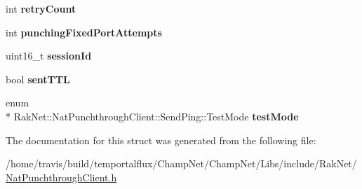 \begin{DoxyCompactItemize}
\item 
\hypertarget{struct_rak_net_1_1_nat_punchthrough_client_1_1_send_ping_a096832da2c67b8e4c1420b4d9b018a77}{int {\bfseries retry\-Count}}\label{struct_rak_net_1_1_nat_punchthrough_client_1_1_send_ping_a096832da2c67b8e4c1420b4d9b018a77}

\item 
\hypertarget{struct_rak_net_1_1_nat_punchthrough_client_1_1_send_ping_aa56c70771d1d4069441b4dd9264d119a}{int {\bfseries punching\-Fixed\-Port\-Attempts}}\label{struct_rak_net_1_1_nat_punchthrough_client_1_1_send_ping_aa56c70771d1d4069441b4dd9264d119a}

\item 
\hypertarget{struct_rak_net_1_1_nat_punchthrough_client_1_1_send_ping_aa52ed71f671a66001f7c31c16f8c9c09}{uint16\-\_\-t {\bfseries session\-Id}}\label{struct_rak_net_1_1_nat_punchthrough_client_1_1_send_ping_aa52ed71f671a66001f7c31c16f8c9c09}

\item 
\hypertarget{struct_rak_net_1_1_nat_punchthrough_client_1_1_send_ping_a3123b7acacfefdc2e74f31ad6a5d6515}{bool {\bfseries sent\-T\-T\-L}}\label{struct_rak_net_1_1_nat_punchthrough_client_1_1_send_ping_a3123b7acacfefdc2e74f31ad6a5d6515}

\item 
\hypertarget{struct_rak_net_1_1_nat_punchthrough_client_1_1_send_ping_a46f9a769efd96a60919ce9e61eb8756f}{enum \\*
Rak\-Net\-::\-Nat\-Punchthrough\-Client\-::\-Send\-Ping\-::\-Test\-Mode {\bfseries test\-Mode}}\label{struct_rak_net_1_1_nat_punchthrough_client_1_1_send_ping_a46f9a769efd96a60919ce9e61eb8756f}

\end{DoxyCompactItemize}


The documentation for this struct was generated from the following file\-:\begin{DoxyCompactItemize}
\item 
/home/travis/build/temportalflux/\-Champ\-Net/\-Champ\-Net/\-Libs/include/\-Rak\-Net/\hyperlink{_nat_punchthrough_client_8h}{Nat\-Punchthrough\-Client.\-h}\end{DoxyCompactItemize}
